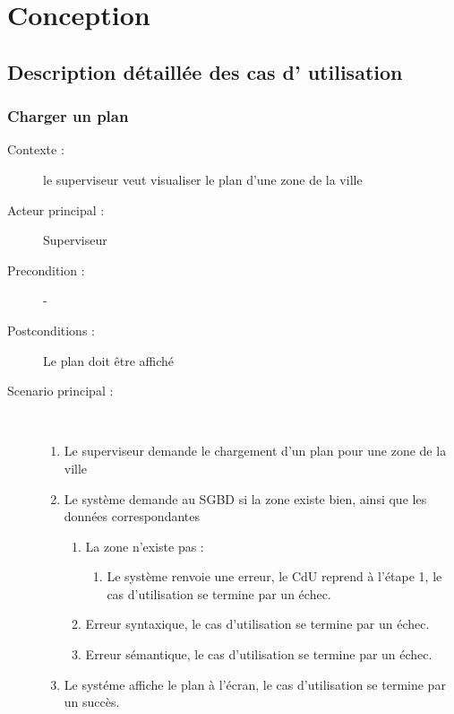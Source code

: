 \chapter{Conception}



\section{Description d\'etaill\'ee des cas d’ utilisation}

\subsection{Charger un plan}
\begin{description}
    \item[Contexte :] le superviseur veut visualiser le plan d'une zone de la ville
    \item[Acteur principal :] Superviseur
    \item[Precondition :] -
    \item[Postconditions :] Le plan doit \^etre affich\'e
    \item[Scenario principal :] ~
    \begin{enumerate}
        \item Le superviseur demande le chargement d'un plan pour une zone de la ville
        \item Le syst\`eme demande au SGBD si la zone existe bien, ainsi que les donn\'ees correspondantes
        \begin{enumerate}
            \item La zone n'existe pas :
            \begin{enumerate}
                \item Le syst\`eme renvoie une erreur, le CdU reprend \`a l'\'etape 1, le cas d'utilisation se termine par un \'echec.
            \end{enumerate}
            \item Erreur syntaxique, le cas d'utilisation se termine par un \'echec.
            \item Erreur s\'emantique, le cas d'utilisation se termine par un \'echec.
        \end{enumerate}
        \item Le syst\'eme affiche le plan \`a l'\'ecran, le cas d'utilisation se termine par un succ\`es.
    \end{enumerate}
\end{description}
\pagebreak


